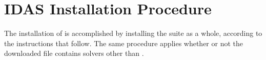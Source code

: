 \chapter{IDAS Installation Procedure}\label{c:install}

The installation of {\idas} is accomplished by installing the
{\sundials} suite as a whole, according to the instructions that
follow.   The same procedure applies whether or not the downloaded
file contains solvers other than {\idas}.

